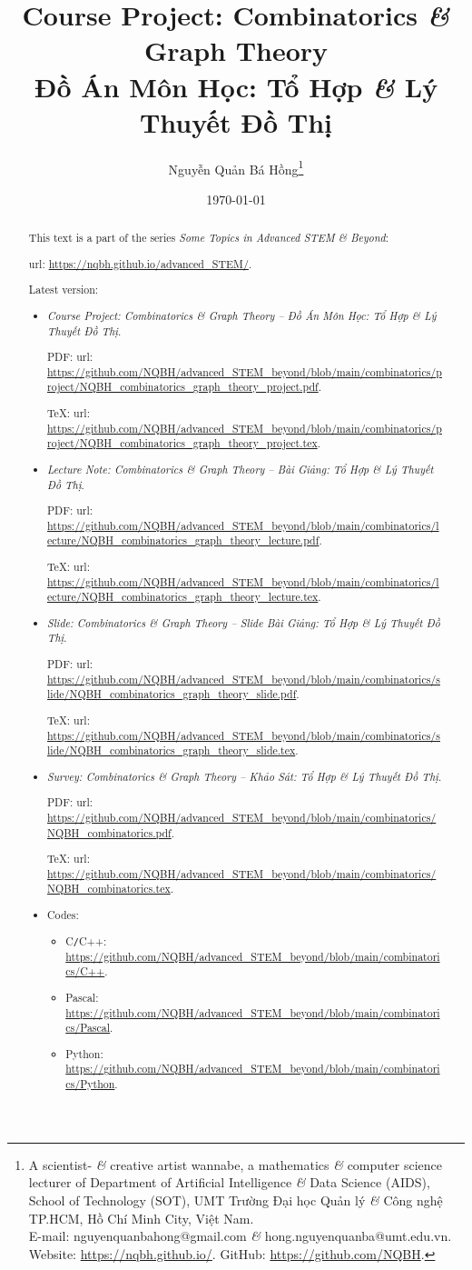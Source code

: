 \documentclass{article}
\title{Course Project: Combinatorics {\it\&} Graph Theory\\Đồ Án Môn Học: Tổ Hợp {\it\&} Lý Thuyết Đồ Thị}
\author{Nguyễn Quản Bá Hồng\footnote{A scientist- {\it\&} creative artist wannabe, a mathematics {\it\&} computer science lecturer of Department of Artificial Intelligence {\it\&} Data Science (AIDS), School of Technology (SOT), UMT Trường Đại học Quản lý {\it\&} Công nghệ TP.HCM, Hồ Chí Minh City, Việt Nam.\\E-mail: {\sf nguyenquanbahong@gmail.com} {\it\&} {\sf hong.nguyenquanba@umt.edu.vn}. Website: \url{https://nqbh.github.io/}. GitHub: \url{https://github.com/NQBH}.}}
\date{\today}
\begin{document}
\maketitle
\begin{abstract}
    This text is a part of the series {\it Some Topics in Advanced STEM \& Beyond}:

    {\sc url}: \url{https://nqbh.github.io/advanced_STEM/}.

    Latest version:
    \begin{itemize}
        \item {\it Course Project: Combinatorics \& Graph Theory -- Đồ Án Môn Học: Tổ Hợp \& Lý Thuyết Đồ Thị}.

        PDF: {\sc url}: \url{https://github.com/NQBH/advanced_STEM_beyond/blob/main/combinatorics/project/NQBH_combinatorics_graph_theory_project.pdf}.

        \TeX: {\sc url}: \url{https://github.com/NQBH/advanced_STEM_beyond/blob/main/combinatorics/project/NQBH_combinatorics_graph_theory_project.tex}.
        \item {\it Lecture Note: Combinatorics \& Graph Theory -- Bài Giảng: Tổ Hợp \& Lý Thuyết Đồ Thị}.

        PDF: {\sc url}: \url{https://github.com/NQBH/advanced_STEM_beyond/blob/main/combinatorics/lecture/NQBH_combinatorics_graph_theory_lecture.pdf}.

        \TeX: {\sc url}: \url{https://github.com/NQBH/advanced_STEM_beyond/blob/main/combinatorics/lecture/NQBH_combinatorics_graph_theory_lecture.tex}.
        \item {\it Slide: Combinatorics \& Graph Theory -- Slide Bài Giảng: Tổ Hợp \& Lý Thuyết Đồ Thị}.

        PDF: {\sc url}: \url{https://github.com/NQBH/advanced_STEM_beyond/blob/main/combinatorics/slide/NQBH_combinatorics_graph_theory_slide.pdf}.

        \TeX: {\sc url}: \url{https://github.com/NQBH/advanced_STEM_beyond/blob/main/combinatorics/slide/NQBH_combinatorics_graph_theory_slide.tex}.
        \item {\it Survey: Combinatorics \& Graph Theory -- Khảo Sát: Tổ Hợp \& Lý Thuyết Đồ Thị}.

        PDF: {\sc url}: \url{https://github.com/NQBH/advanced_STEM_beyond/blob/main/combinatorics/NQBH_combinatorics.pdf}.

        \TeX: {\sc url}: \url{https://github.com/NQBH/advanced_STEM_beyond/blob/main/combinatorics/NQBH_combinatorics.tex}.
        \item Codes:
        \begin{itemize}
            \item C{\tt/}C++: \url{https://github.com/NQBH/advanced_STEM_beyond/blob/main/combinatorics/C++}.
            \item Pascal: \url{https://github.com/NQBH/advanced_STEM_beyond/blob/main/combinatorics/Pascal}.
            \item Python: \url{https://github.com/NQBH/advanced_STEM_beyond/blob/main/combinatorics/Python}.
        \end{itemize}
    \end{itemize}
\end{abstract}
\end{document}
